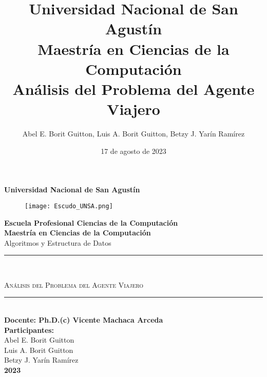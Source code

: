 \documentclass{article}
\title{\textbf{%
    Universidad Nacional de San Agustín \\
    Maestría en Ciencias de la Computación \\
    \large Análisis del Problema del Agente Viajero}}
\author{Abel E. Borit Guitton, Luis A. Borit Guitton, Betzy J. Yarín Ramírez}
\date{17 de agosto de 2023}
\begin{document}
\begin{titlepage}
    \begin{center}

    \centering
            {\huge\textbf{Universidad Nacional de San Agustín}}\\
            \vspace{6mm}
            \begin{figure}[h]
                \centering           
                \texttt{[image: Escudo\_UNSA.png]}
            \end{figure}
            \vspace{6mm}
            {\LARGE\textbf{Escuela Profesional Ciencias de la Computación}}\\
            \vspace{5mm}
            {\LARGE\textbf{Maestría en Ciencias de la Computación}}
            \vspace{6mm}\\
            {\Large Algoritmos y Estructura de Datos}
            \vspace{5mm}\\
            \textcolor{guinda}{\rule{\linewidth}{0.75mm}}\\
            \vspace{2mm}
            \begin{spacing}{1.5}
            {\LARGE\textsc{Análisis del Problema del Agente Viajero} }
            \end{spacing}
            \textcolor{guinda}{\rule{\linewidth}{0.75mm}}\\
            \vspace{1cm}
            \Large\textbf{Docente: Ph.D.(c) Vicente Machaca Arceda}\\
            \vspace{1.3cm} 
            \Large\textbf{Participantes:}\\    
            \vspace{3mm}
            \Large Abel E. Borit Guitton \\
            \Large Luis A. Borit Guitton \\
            \Large Betzy J. Yarín Ramírez \\
            \vspace{2cm}
            \Huge\textbf{2023}

    \end{center}
\end{titlepage}
\maketitle
\tableofcontents
\clearpage
\end{document}
